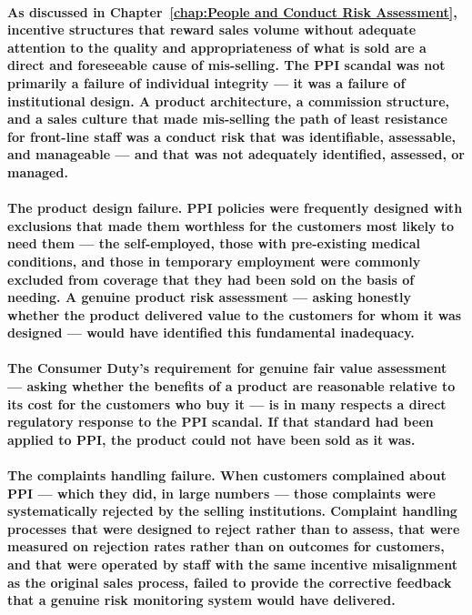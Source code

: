 \paragraph{As discussed in Chapter~\ref{chap:People and Conduct Risk Assessment}, incentive structures that reward sales volume without adequate attention to the quality and appropriateness of what is sold are a direct and foreseeable cause of mis-selling. The PPI scandal was not primarily a failure of individual integrity — it was a failure of institutional design. A product architecture, a commission structure, and a sales culture that made mis-selling the path of least resistance for front-line staff was a conduct risk that was identifiable, assessable, and manageable — and that was not adequately identified, assessed, or managed.}
\paragraph{\textbf{The product design failure}. PPI policies were frequently designed with exclusions that made them worthless for the customers most likely to need them — the self-employed, those with pre-existing medical conditions, and those in temporary employment were commonly excluded from coverage that they had been sold on the basis of needing. A genuine product risk assessment — asking honestly whether the product delivered value to the customers for whom it was designed — would have identified this fundamental inadequacy.}
\paragraph{The Consumer Duty's requirement for genuine fair value assessment — asking whether the benefits of a product are reasonable relative to its cost for the customers who buy it — is in many respects a direct regulatory response to the PPI scandal. If that standard had been applied to PPI, the product could not have been sold as it was.}
\paragraph{\textbf{The complaints handling failure}. When customers complained about PPI — which they did, in large numbers — those complaints were systematically rejected by the selling institutions. Complaint handling processes that were designed to reject rather than to assess, that were measured on rejection rates rather than on outcomes for customers, and that were operated by staff with the same incentive misalignment as the original sales process, failed to provide the corrective feedback that a genuine risk monitoring system would have delivered.}
